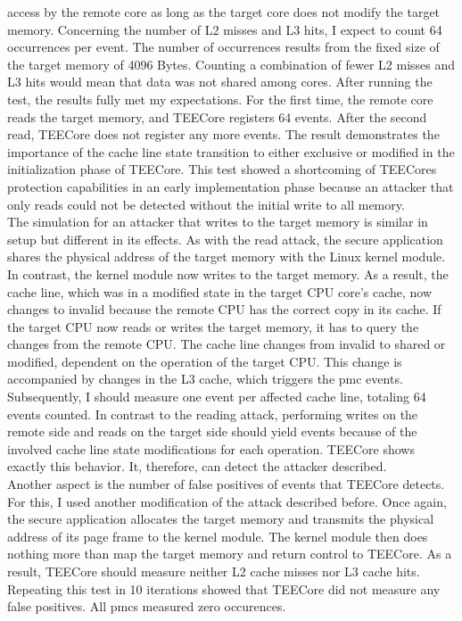 access by the remote core as long as the target core does not modify the target
memory. Concerning the number of L2 misses and L3 hits, I expect to count 64
occurrences per event. The number of occurrences results from the fixed size of
the target memory of 4096 Bytes. Counting a combination of fewer L2 misses and
L3 hits would mean that data was not shared among cores. After running the test,
the results fully met my expectations. For the first time, the remote core reads
the target memory, and TEECore registers 64 events. After the second read,
TEECore does not register any more events. The result demonstrates the
importance of the cache line state transition to either exclusive or modified in
the initialization phase of TEECore. This test showed a shortcoming of TEECores
protection capabilities in an early implementation phase because an attacker
that only reads could not be detected without the initial write to all memory.\\

The simulation for an attacker that writes to the target memory is similar in
setup but different in its effects. As with the read attack, the secure
application shares the physical address of the target memory with the Linux
kernel module. In contrast, the kernel module now writes to the target memory.
As a result, the cache line, which was in a modified state in the target CPU
core's cache, now changes to invalid because the remote CPU has the correct copy
in its cache. If the target CPU now reads or writes the target memory, it has to
query the changes from the remote CPU. The cache line changes from invalid to
shared or modified, dependent on the operation of the target CPU. This change is
accompanied by changes in the L3 cache, which triggers the \gls{pmc} events.
Subsequently, I should measure one event per affected cache line, totaling 64
events counted. In contrast to the reading attack, performing writes on the
remote side and reads on the target side should yield events because of the
involved cache line state modifications for each operation. TEECore shows
exactly this behavior. It, therefore, can detect the attacker described.\\

Another aspect is the number of false positives of events that TEECore detects.
For this, I used another modification of the attack described before. Once
again, the secure application allocates the target memory and transmits the
physical address of its page frame to the kernel module. The kernel module then
does nothing more than map the target memory and return control to TEECore. As a
result, TEECore should measure neither L2 cache misses nor L3 cache hits.
Repeating this test in 10 iterations showed that TEECore did not measure any
false positives. All \glspl{pmc} measured zero occurences.\\

